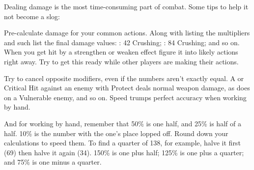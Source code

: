 \begin{multicols}{2}
    \begin{boco}
        Dealing damage is the most time-consuming part of combat. Some tips to help it not become a slog:

        Pre-calculate damage for your common actions. Along with listing the multipliers and such list the final damage values: : 42 Crushing; : 84 Crushing; and so on. When you get hit by a strengthen or weaken effect figure it into likely actions right away. Try to get this ready while other players are making their actions. 

        Try to cancel opposite modifiers, even if the numbers aren't exactly equal. A  or Critical Hit against an enemy with Protect deals normal weapon damage, as does  on a Vulnerable enemy, and so on. Speed trumps perfect accuracy when working by hand.

        And for working by hand, remember that 50\% is one half, and 25\% is half of a half. 10\% is the number with the one's place lopped off. Round down your calculations to speed them. To find a quarter of 138, for example, halve it first (69) then halve it again (34). 150\% is one plus half; 125\% is one plus a quarter; and 75\% is one minus a quarter.

    \end{boco}




\end{multicols}

